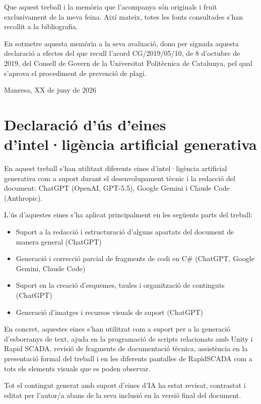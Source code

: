 \documentclass[a4paper,11pt,DIV=13,headings=normal,abstract=true,twoside=semi]{article}
\begin{document}
    \noindent Que aquest treball i la memòria que l'acompanya són originals i fruit exclusivament de la meva feina. Així mateix, totes les fonts consultades s'han recollit a la bibliografia.

    \noindent En sotmetre aquesta memòria a la seva avaluació, dono per signada aquesta declaració a efectes del que recull l'acord CG/2019/05/10, de 8 d'octubre de 2019, del Consell de Govern de la Universitat Politècnica de Catalunya, pel qual s'aprova el procediment de prevenció de plagi.
    
    \noindent Manresa, XX de juny de 2026
\thispagestyle{empty}

\newpage

\section*{Declaració d'ús d'eines d'intel·ligència artificial generativa}

En aquest treball s'han utilitzat diferents eines d'intel·ligència artificial generativa com a suport durant el desenvolupament tècnic i la redacció del document: ChatGPT (OpenAI, GPT-5.5), Google Gemini i Claude Code (Anthropic). 

L'ús d'aquestes eines s'ha aplicat principalment en les següents parts del treball:

\begin{itemize}
    \item Suport a la redacció i estructuració d'alguns apartats del document de manera general (ChatGPT)
    \item Generació i correcció parcial de fragments de codi en C\# (ChatGPT, Google Gemini, Claude Code)
    \item Suport en la creació d'esquemes, taules i organització de continguts (ChatGPT)
    \item Generació d'imatges i recursos visuals de suport (ChatGPT)
\end{itemize}

En concret, aquestes eines s'han utilitzat com a suport per a la generació d'esborranys de text, ajuda en la programació de scripts relacionats amb Unity i Rapid SCADA, revisió de fragments de documentació tècnica, assistència en la presentació formal del treball i en les diferents pantalles de RapidSCADA com a tots els elements visuals que es poden observar.

Tot el contingut generat amb suport d'eines d'IA ha estat revisat, contrastat i editat per l'autor/a abans de la seva inclusió en la versió final del document.
\end{document}
